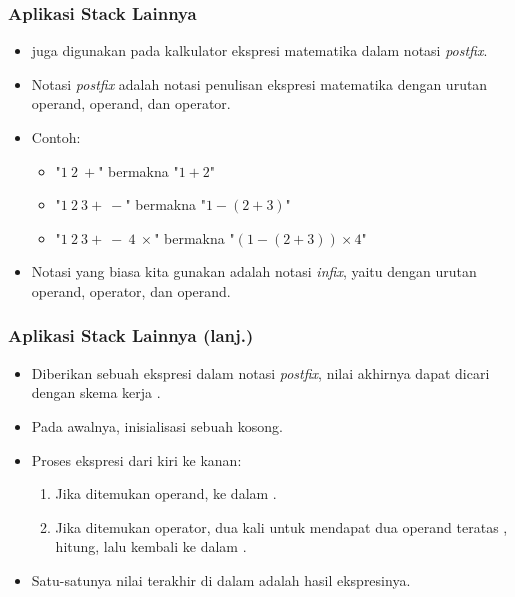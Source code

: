 \begin{frame}
\frametitle{Aplikasi Stack Lainnya}
\begin{itemize}
  \item {} juga digunakan pada kalkulator ekspresi matematika dalam notasi \textit{postfix}.
  \item Notasi \textit{postfix} adalah notasi penulisan ekspresi  matematika dengan urutan operand, operand, dan operator.
  \item Contoh:
  \begin{itemize}
    \item "$1 \ 2 \ +$" bermakna "$1 + 2$"
    \item "$1 \ 2 \ 3 + \ -$" bermakna "$1 - (2 + 3)$"
    \item "$1 \ 2 \ 3 + \ - \ 4 \ \times$" bermakna "$(1 - (2 + 3)) \times 4$"
  \end{itemize}
  \item Notasi yang biasa kita gunakan adalah notasi \textit{infix}, yaitu dengan urutan operand, operator, dan operand.
\end{itemize}
\end{frame}

\begin{frame}
\frametitle{Aplikasi Stack Lainnya (lanj.)}
\begin{itemize}
  \item Diberikan sebuah ekspresi dalam notasi \textit{postfix}, nilai akhirnya dapat dicari dengan skema kerja .
  \item Pada awalnya, inisialisasi sebuah  kosong.
  \item Proses ekspresi dari kiri ke kanan:
  \begin{enumerate}
    \item Jika ditemukan operand,  ke dalam .
    \item Jika ditemukan operator,  dua kali untuk mendapat dua operand teratas , hitung, lalu  kembali ke dalam .
  \end{enumerate}
  \item Satu-satunya nilai terakhir di dalam  adalah hasil ekspresinya.
\end{itemize}
\end{frame}

